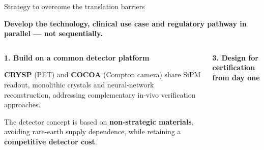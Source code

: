 \documentclass[aspectratio=169,11pt]{beamer}
\begin{document}
\begin{frame}{Strategy to overcome the translation barriers}

\vspace{0.05cm}

\begin{center}
{\small\bfseries
Develop the technology, clinical use case and regulatory pathway in parallel ---
not sequentially.
}
\end{center}

\vspace{0.22cm}

\begin{columns}[T,onlytextwidth]


\colorbox{blue!4}{
\begin{minipage}[t][2.55cm][t]{0.94\linewidth}

{\scriptsize\bfseries\color{PTblue}
1. Build on a common detector platform
}

\vspace{0.10cm}

{\tiny
\textbf{CRYSP} (PET) and \textbf{COCOA} (Compton camera) share SiPM readout,
monolithic crystals and neural-network reconstruction, addressing
complementary in-vivo verification approaches.

\vspace{0.10cm}

The detector concept is based on \textbf{non-strategic materials},
avoiding rare-earth supply dependence, while retaining a
\textbf{competitive detector cost}.
}

\end{minipage}
}

\vspace{0.18cm}

\colorbox{blue!4}{
\begin{minipage}[t][2.55cm][t]{0.94\linewidth}

{\scriptsize\bfseries\color{PTblue}
3. Design for certification from day one
}

\vspace{0.10cm}


\end{minipage}}
\end{columns}
\end{frame}
\end{document}
